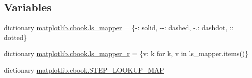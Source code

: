 \subsection*{Variables}
\begin{DoxyCompactItemize}
\item 
dictionary \hyperlink{namespacematplotlib_1_1cbook_ac142c2daf9ce1acc76fb1d8748cb331f}{matplotlib.\+cbook.\+ls\+\_\+mapper} = \{\textquotesingle{}-\/\textquotesingle{}\+: \textquotesingle{}solid\textquotesingle{}, \textquotesingle{}-\/-\/\textquotesingle{}\+: \textquotesingle{}dashed\textquotesingle{}, \textquotesingle{}-\/.\textquotesingle{}\+: \textquotesingle{}dashdot\textquotesingle{}, \textquotesingle{}\+:\textquotesingle{}\+: \textquotesingle{}dotted\textquotesingle{}\}
\item 
dictionary \hyperlink{namespacematplotlib_1_1cbook_adb3290becfb5c026bb2ede58b5ce05fa}{matplotlib.\+cbook.\+ls\+\_\+mapper\+\_\+r} = \{v\+: k for k, v in ls\+\_\+mapper.\+items()\}
\item 
dictionary \hyperlink{namespacematplotlib_1_1cbook_ae4d385490090a4c9ed6f059cb2dedb5d}{matplotlib.\+cbook.\+S\+T\+E\+P\+\_\+\+L\+O\+O\+K\+U\+P\+\_\+\+M\+AP}
\end{DoxyCompactItemize}
